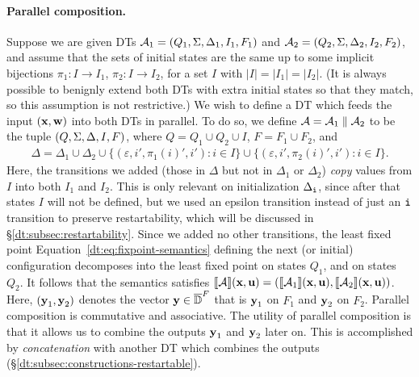 \paragraph*{Parallel composition.}
Suppose we are given DTs $\mathcal{A}_1 = (Q_{1}, \Sigma, \Delta_{1}, I_{1}, F_{1})$ and $\mathcal{A}_2 = (Q_{2}, \Sigma, \Delta_{2}, I_{2}, F_{2})$, and assume that the sets of initial states are the same up to some implicit bijections $\pi_1: I \to I_1$, $\pi_2: I \to I_2$, for a set $I$ with $|I| = |I_1| = |I_2|$. (It is always possible to benignly extend both DTs with extra initial states so that they match, so this assumption is not restrictive.)
We wish to define a DT which feeds the input $(\textbf{x},\textbf{w})$ into both DTs in parallel. To do so, we define $\mathcal{A} = \mathcal{A}_1 \; \| \; \mathcal{A}_2$ to be the tuple $(Q, \Sigma, \Delta, I, F){}$, where $Q = Q_1 \cup Q_2 \cup I$, $F = F_1 \cup F_2$, and
\begin{align*}
\Delta = \Delta_1 \cup \Delta_2
    \cup \big\{(\varepsilon, i', \pi_1(i)', i') : i \in I \big\}
    \cup \big\{(\varepsilon, i', \pi_2(i)', i') : i \in I \big\}.
\end{align*}
Here, the transitions we added (those in $\Delta$ but not in $\Delta_1$ or $\Delta_2$) \emph{copy} values from $I$ into both $I_1$ and $I_2$. This is only relevant on initialization $\Delta_{\texttt{i}}$, since after that states $I$ will not be defined, but we used an epsilon transition instead of just an ${\texttt{i}}$ transition to preserve restartability, which will be discussed in \S\ref{dt:subsec:restartability}. Since we added no other transitions, the least fixed point Equation~\eqref{dt:eq:fixpoint-semantics} defining the next (or initial) configuration decomposes into the least fixed point on states $Q_1$, and on states $Q_2$. It follows that the semantics satisfies $\llbracket \mathcal{A} \rrbracket(\textbf{x},\textbf{u}) = (\llbracket \mathcal{A}_1 \rrbracket(\textbf{x},\textbf{u}),\llbracket \mathcal{A}_2 \rrbracket(\textbf{x},\textbf{u}))$. Here, $(\textbf{y}_1,\textbf{y}_2)$ denotes the vector $\textbf{y} \in \overline{\mathbb{D}{}}^F$ that is $\textbf{y}_1$ on $F_1$ and $\textbf{y}_2$ on $F_2$.
Parallel composition is commutative and associative.
The utility of parallel composition is that it allows us to combine the outputs $\textbf{y}_1$ and $\textbf{y}_2$ later on. This is accomplished by \emph{concatenation} with another DT which combines the outputs (\S\ref{dt:subsec:constructions-restartable}).

\begin{figure*}[h]

\label{dt:fig:parallel-composition}
\end{figure*}

